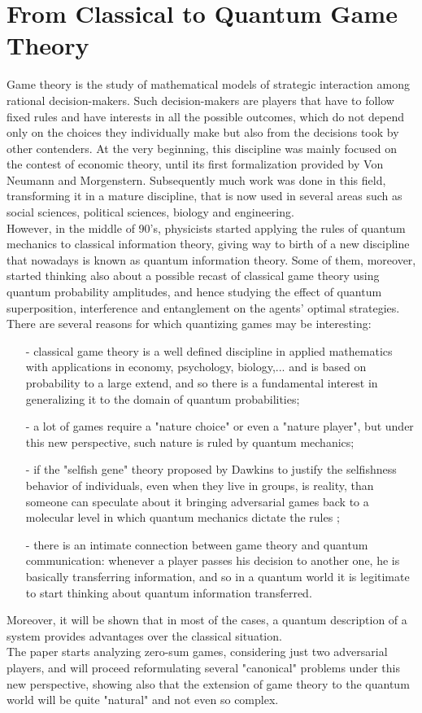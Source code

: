 \hfill

\section{From Classical to Quantum Game Theory}
Game theory is the study of mathematical models of strategic interaction among rational decision-makers. Such decision-makers are players that have to follow fixed rules and have interests in all the possible outcomes, which do not depend only on the choices they individually make but also from the decisions took by other contenders. At the very beginning, this discipline was mainly focused on the contest of economic theory, until its first formalization provided by Von Neumann and Morgenstern. Subsequently much work was done in this field, transforming it in a mature discipline, that is now used in several areas such as social sciences, political sciences, biology and engineering.\\
However, in the middle of 90's, physicists started applying the rules of quantum mechanics to classical information theory, giving way to birth of a new discipline that nowadays is known as quantum information theory. Some of them, moreover, started thinking also about a possible recast of classical game theory using quantum probability amplitudes, and hence studying the effect of quantum superposition, interference and entanglement on the agents’ optimal strategies.\\
There are several reasons for which quantizing games may be interesting:
\begin{itemize}[noitemsep]
	\item[-] classical game theory is a well defined discipline in applied mathematics with applications in economy, psychology, biology,... and is based on probability to a large extend, and so there is a fundamental interest in generalizing it to the domain of quantum probabilities;
	\item[-] a lot of games require a "nature choice" or even a "nature player", but under this new perspective, such nature is ruled by quantum mechanics;
	\item[-] if the "selfish gene" theory proposed by Dawkins to justify the selfishness behavior of individuals, even when they live in groups, is reality, than someone can speculate about it bringing adversarial games back to a molecular level in which quantum mechanics dictate the rules \cite{ozhigov2013quantum};
	\item[-] there is an intimate connection between game theory and quantum communication: whenever a player passes his decision to another one, he is basically transferring information, and so in a quantum world it is legitimate to start thinking about quantum information transferred. 
\end{itemize} 
Moreover, it will be shown that in most of the cases, a quantum description of a system provides
advantages over the classical situation.\\
The paper starts analyzing zero-sum games, considering just two adversarial players, and will proceed reformulating several "canonical" problems under this new perspective, showing also that the extension of game theory to the quantum world will be quite "natural" and not even so complex. 
